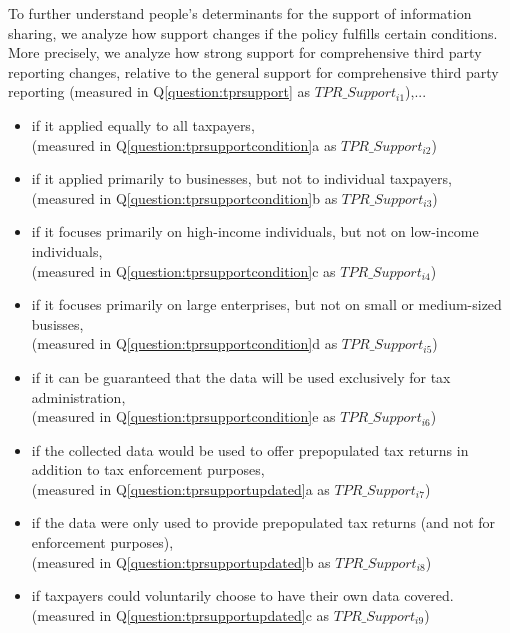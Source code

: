 \documentclass[11pt]{article}
\begin{document}
To further understand people's determinants for the support of information sharing, we analyze how support changes if the policy fulfills certain conditions. More precisely, we analyze how strong support for comprehensive third party reporting changes, relative to the general support for comprehensive third party reporting (measured in Q\ref{question:tprsupport} as $TPR\_Support_{i1}$),...
\begin{itemize}
    \item if it applied equally to all taxpayers, \\(measured in Q\ref{question:tprsupportcondition}a as $TPR\_Support_{i2}$)
    \item if it applied primarily to businesses, but not to individual taxpayers,\\(measured in Q\ref{question:tprsupportcondition}b as $TPR\_Support_{i3}$)
    \item if it focuses primarily on high-income individuals, but not on low-income individuals, \\(measured in Q\ref{question:tprsupportcondition}c as $TPR\_Support_{i4}$)
    \item if it focuses primarily on large enterprises, but not on small or medium-sized busisses, \\(measured in Q\ref{question:tprsupportcondition}d as $TPR\_Support_{i5}$)
    \item if it can be guaranteed that the data will be used exclusively for tax administration, \\(measured in Q\ref{question:tprsupportcondition}e as $TPR\_Support_{i6}$)
    \item if the collected data would be used to offer prepopulated tax returns in addition to tax enforcement purposes, \\ (measured in Q\ref{question:tprsupportupdated}a as $TPR\_Support_{i7}$)
    \item if the data were only used to provide prepopulated tax returns (and not for enforcement purposes), \\(measured in Q\ref{question:tprsupportupdated}b as $TPR\_Support_{i8}$)
    \item if taxpayers could voluntarily choose to have their own data covered.\\(measured in Q\ref{question:tprsupportupdated}c as $TPR\_Support_{i9}$)
    \end{itemize}
\end{document}
